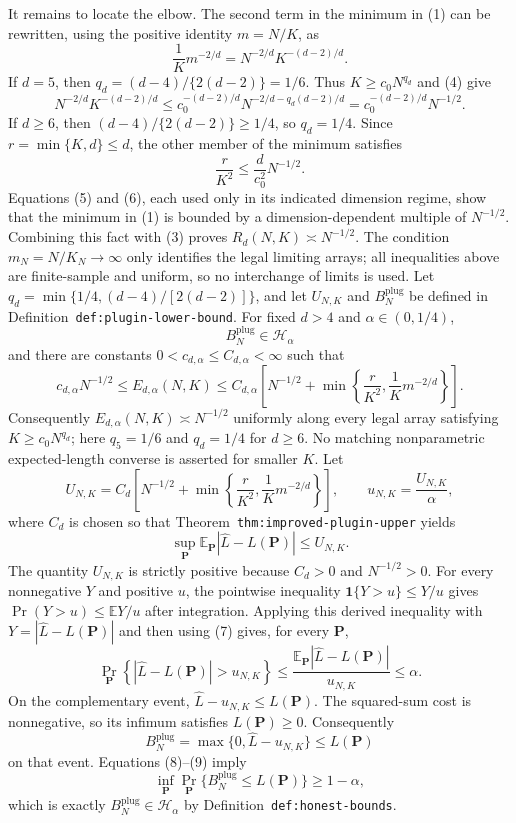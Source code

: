 It remains to locate the elbow. The second term in the minimum in (1) can be rewritten, using the positive identity \(m=N/K\), as
\[
\frac1K m^{-2/d}=N^{-2/d}K^{-(d-2)/d}.
\tag{4}
\]
If \(d=5\), then \(q_d=(d-4)/\{2(d-2)\}=1/6\). Thus \(K\ge c_0N^{q_d}\) and (4) give
\[
N^{-2/d}K^{-(d-2)/d}
\le c_0^{-(d-2)/d}
N^{-2/d-q_d(d-2)/d}
=c_0^{-(d-2)/d}N^{-1/2}.
\tag{5}
\]
If \(d\ge6\), then \((d-4)/\{2(d-2)\}\ge1/4\), so \(q_d=1/4\). Since \(r=\min\{K,d\}\le d\), the other member of the minimum satisfies
\[
\frac r{K^2}\le \frac d{c_0^2}N^{-1/2}.
\tag{6}
\]
Equations (5) and (6), each used only in its indicated dimension regime, show that the minimum in (1) is bounded by a dimension-dependent multiple of \(N^{-1/2}\). Combining this fact with (3) proves \(R_d(N,K)\asymp N^{-1/2}\). The condition \(m_N=N/K_N\to\infty\) only identifies the legal limiting arrays; all inequalities above are finite-sample and uniform, so no interchange of limits is used.
Let \(q_d=\min\{1/4,(d-4)/[2(d-2)]\}\), and let \(U_{N,K}\) and \(B_N^{\mathrm{plug}}\) be defined in Definition~\texttt{def:plugin-lower-bound}. For fixed \(d>4\) and \(\alpha\in(0,1/4)\),
\[
B_N^{\mathrm{plug}}\in\mathcal H_\alpha
\]
and there are constants \(0<c_{d,\alpha}\le C_{d,\alpha}<\infty\) such that
\[
c_{d,\alpha}N^{-1/2}
\le E_{d,\alpha}(N,K)
\le C_{d,\alpha}\left[N^{-1/2}+\min\left\{\frac r{K^2},\frac1K m^{-2/d}\right\}\right].
\]
Consequently \(E_{d,\alpha}(N,K)\asymp N^{-1/2}\) uniformly along every legal array satisfying \(K\ge c_0N^{q_d}\); here \(q_5=1/6\) and \(q_d=1/4\) for \(d\ge6\). No matching nonparametric expected-length converse is asserted for smaller \(K\).
Let
\[
U_{N,K}=C_d\left[N^{-1/2}+\min\left\{\frac r{K^2},\frac1K m^{-2/d}\right\}\right],
\qquad u_{N,K}=\frac{U_{N,K}}{\alpha},
\]
where \(C_d\) is chosen so that Theorem~\texttt{thm:improved-plugin-upper} yields
\[
\sup_{\mathbf P}\mathbb E_{\mathbf P}|\widehat L-L(\mathbf P)|\le U_{N,K}.
\tag{7}
\]
The quantity \(U_{N,K}\) is strictly positive because \(C_d>0\) and \(N^{-1/2}>0\). For every nonnegative \(Y\) and positive \(u\), the pointwise inequality \(\mathbf 1\{Y>u\}\le Y/u\) gives \(\Pr(Y>u)\le\mathbb EY/u\) after integration. Applying this derived inequality with \(Y=|\widehat L-L(\mathbf P)|\) and then using (7) gives, for every \(\mathbf P\),
\[
\Pr_{\mathbf P}\left\{|\widehat L-L(\mathbf P)|>u_{N,K}\right\}
\le \frac{\mathbb E_{\mathbf P}|\widehat L-L(\mathbf P)|}{u_{N,K}}
\le\alpha.
\tag{8}
\]
On the complementary event, \(\widehat L-u_{N,K}\le L(\mathbf P)\). The squared-sum cost is nonnegative, so its infimum satisfies \(L(\mathbf P)\ge0\). Consequently
\[
B_N^{\mathrm{plug}}
=\max\{0,\widehat L-u_{N,K}\}
\le L(\mathbf P)
\tag{9}
\]
on that event. Equations (8)--(9) imply
\[
\inf_{\mathbf P}\Pr_{\mathbf P}\{B_N^{\mathrm{plug}}\le L(\mathbf P)\}\ge1-\alpha,
\]
which is exactly \(B_N^{\mathrm{plug}}\in\mathcal H_\alpha\) by Definition~\texttt{def:honest-bounds}.

